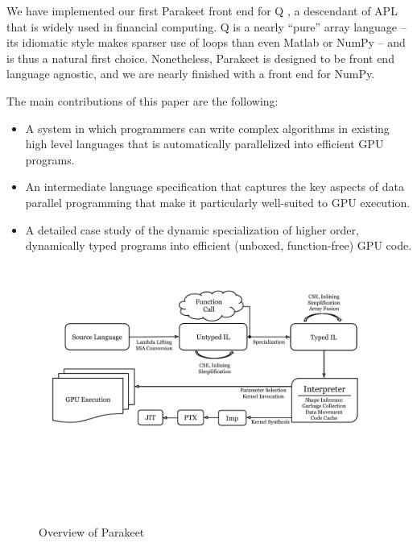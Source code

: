 \documentclass[preprint]{sigplanconf}
\begin{document}
We have implemented our first Parakeet front end for Q \cite{Borr08}, a descendant of APL that is widely used in financial computing. Q is a nearly ``pure'' array language -- its idiomatic style makes sparser use of loops than even Matlab or NumPy -- and is thus a natural first choice. Nonetheless, Parakeet is designed to be front end language agnostic, and we are nearly finished with a front end for NumPy.

The main contributions of this paper are the following:

\begin{itemize}
\item A system in which programmers can write complex algorithms in existing high level languages that is automatically parallelized into efficient GPU programs.

\item An intermediate language specification that captures the key aspects of data parallel programming that make it particularly well-suited to GPU execution.

\item A detailed case study of the dynamic specialization of higher order, dynamically typed programs into efficient (unboxed, function-free) GPU code.
\end{itemize}

\begin{figure}[t!bh]
\begin{center}
\leavevmode
\includegraphics[scale=0.6, trim=10pt 180pt 10pt 120pt]{Pipeline.pdf}
\end{center}
\caption{Overview of Parakeet}
\label{fig:overview}
\end{figure}
\end{document}
